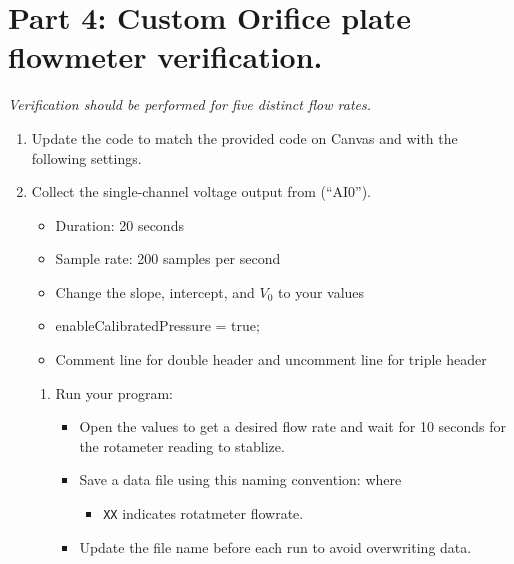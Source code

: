 \documentclass{article} %
\begin{document}
\section{Part 4: Custom Orifice plate flowmeter verification.}
\emph{ Verification should be performed for five distinct flow rates.}
\begin{enumerate}
    \item Update the code  to match the provided code on Canvas and with the following settings.
    \item Collect the single-channel voltage output from (“AI0”).
    \begin{itemize}
        \item Duration: 20 seconds
        \item Sample rate: 200 samples per second
        \item Change the slope, intercept, and $V_0$ to your values
        \item enableCalibratedPressure = true;
        \item Comment line for double header and uncomment line for triple header
    \end{itemize}
        \begin{enumerate}[label=\alph*.]
        \item Run your program:
        \begin{itemize}
            \item Open the values to get a desired flow rate and wait for 10 seconds for the rotameter reading to stablize.
            \item Save a data file using this naming convention:  where
            \begin{itemize}
                \item \texttt{XX} indicates rotatmeter flowrate.
            \end{itemize}
            \item Update the file name before each run to avoid overwriting data.
            \end{itemize}
        

\end{enumerate}
\end{enumerate}
\end{document}
